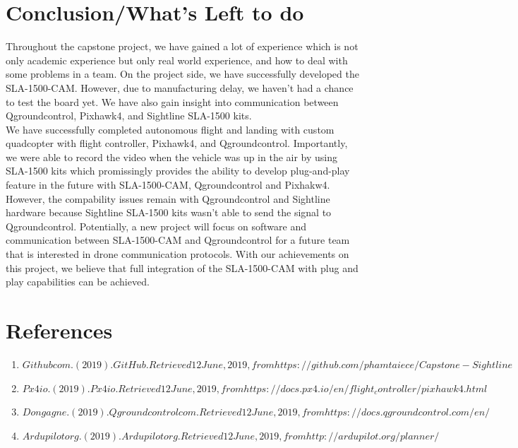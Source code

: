\documentclass[11pt]{article}
\begin{document}
\section{Conclusion/What's Left to do}
Throughout the capstone project, we have gained a lot of experience which is not only academic experience but only real world experience, and how to deal with some problems in a team. On the project side, we have successfully developed the SLA-1500-CAM. However, due to manufacturing delay, we haven't had a chance to test the board yet. We have also gain insight into communication between Qgroundcontrol, Pixhawk4, and Sightline SLA-1500 kits. \\
We have successfully completed autonomous flight and landing with custom quadcopter with flight controller, Pixhawk4, and Qgroundcontrol. Importantly, we were able to record the video when the vehicle was up in the air by using SLA-1500 kits which promissingly provides the ability to develop plug-and-play feature in the future with SLA-1500-CAM, Qgroundcontrol and Pixhakw4. \\
However, the compability issues remain with Qgroundcontrol and Sightline hardware because Sightline SLA-1500 kits wasn't able to send the signal to Qgroundcontrol. Potentially, a new project will focus on software and communication between SLA-1500-CAM and Qgroundcontrol for a future team that is interested in drone communication protocols. With our achievements on this project, we believe that full integration of the SLA-1500-CAM with plug and play capabilities can be achieved.     


\pagebreak

\section{References}
\begin{enumerate}
\item $Githubcom. (2019). GitHub. Retrieved 12 June, 2019, from https://github.com/phamtaiece/Capstone-Sightline$

\item $Px4io. (2019). Px4io. Retrieved 12 June, 2019, from https://docs.px4.io/en/flight_controller/pixhawk4.html$

\item$ Don gagne. (2019). Qgroundcontrolcom. Retrieved 12 June, 2019, from https://docs.qgroundcontrol.com/en/$

\item $Ardupilotorg. (2019). Ardupilotorg. Retrieved 12 June, 2019, from http://ardupilot.org/planner/$

\end{enumerate}	
\end{document}
